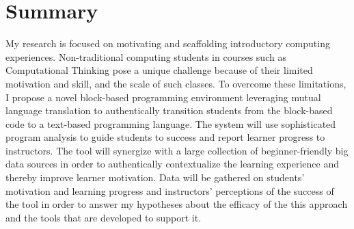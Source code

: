 \section{Summary}

My research is focused on motivating and scaffolding introductory computing experiences.
Non-traditional computing students in courses such as Computational Thinking pose a unique challenge because of their limited motivation and skill, and the scale of such classes.
To overcome these limitations, I propose a novel block-based programming environment leveraging mutual language translation to authentically transition students from the block-based code to a text-based programming language.
The system will use sophisticated program analysis to guide students to success and report learner progress to instructors.
The tool will synergize with a large collection of beginner-friendly big data sources in order to authentically contextualize the learning experience and thereby improve learner motivation.
Data will be gathered on students' motivation and learning progress and instructors' perceptions of the success of the tool in order to answer my hypotheses about the efficacy of the this approach and the tools that are developed to support it.